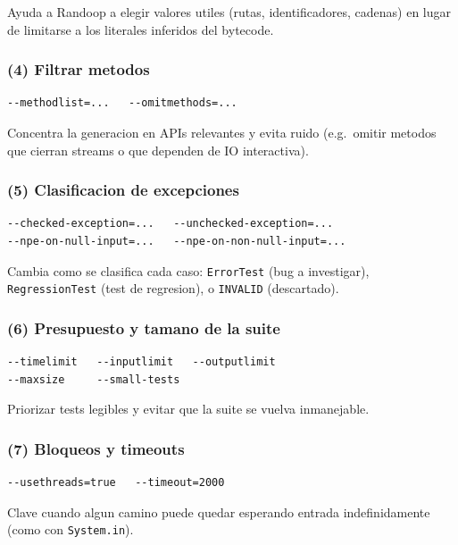 \documentclass[12pt,a4paper]{article}
\begin{document}
Ayuda a Randoop a elegir valores utiles (rutas, identificadores, cadenas) en lugar de
limitarse a los literales inferidos del bytecode.

\subsubsection*{(4) Filtrar metodos}

\begin{lstlisting}[style=codestyle]
--methodlist=...   --omitmethods=...
\end{lstlisting}

Concentra la generacion en APIs relevantes y evita ruido (e.g.\ omitir metodos que cierran
streams o que dependen de IO interactiva).

\subsubsection*{(5) Clasificacion de excepciones}

\begin{lstlisting}[style=codestyle]
--checked-exception=...   --unchecked-exception=...
--npe-on-null-input=...   --npe-on-non-null-input=...
\end{lstlisting}

Cambia como se clasifica cada caso: \texttt{ErrorTest} (bug a investigar),
\texttt{RegressionTest} (test de regresion), o \texttt{INVALID} (descartado).

\subsubsection*{(6) Presupuesto y tamano de la suite}

\begin{lstlisting}[style=codestyle]
--timelimit   --inputlimit   --outputlimit
--maxsize     --small-tests
\end{lstlisting}

Priorizar tests legibles y evitar que la suite se vuelva inmanejable.

\subsubsection*{(7) Bloqueos y timeouts}

\begin{lstlisting}[style=codestyle]
--usethreads=true   --timeout=2000
\end{lstlisting}

Clave cuando algun camino puede quedar esperando entrada indefinidamente (como con
\texttt{System.in}).
\end{document}
